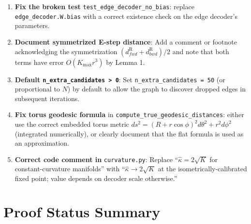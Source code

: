 \documentclass[11pt]{article}
\newcommand{\dR}{d^{\mathrm{R}}}
\newcommand{\Kmax}{K_{\max}}
\begin{document}
\begin{enumerate}
\item \textbf{Fix the broken test} \texttt{test\_edge\_decoder\_no\_bias}: replace
\texttt{edge\_decoder.W.bias} with a correct existence check on the edge decoder's
parameters.

\item \textbf{Document symmetrized E-step distance}: Add a comment or footnote
acknowledging the symmetrization $(\dR_{fwd} + \dR_{bwd})/2$ and note that both
terms have error $O(\Kmax r^3)$ by Lemma 1.

\item \textbf{Default \texttt{n\_extra\_candidates > 0}}: Set
\texttt{n\_extra\_candidates = 50} (or proportional to $N$) by default to allow
the graph to discover dropped edges in subsequent iterations.

\item \textbf{Fix torus geodesic formula} in \texttt{compute\_true\_geodesic\_distances}:
either use the correct embedded torus metric
$ds^2 = (R + r\cos\phi)^2 d\theta^2 + r^2 d\phi^2$ (integrated numerically),
or clearly document that the flat formula is used as an approximation.

\item \textbf{Correct code comment in} \texttt{curvature.py}: Replace
``$\hat\kappa = 2\sqrt{K}$ for constant-curvature manifolds'' with ``$\hat\kappa
\to 2\sqrt{K}$ at the isometrically-calibrated fixed point; value depends on
decoder scale otherwise.''
\end{enumerate}

\section{Proof Status Summary}
\end{document}
